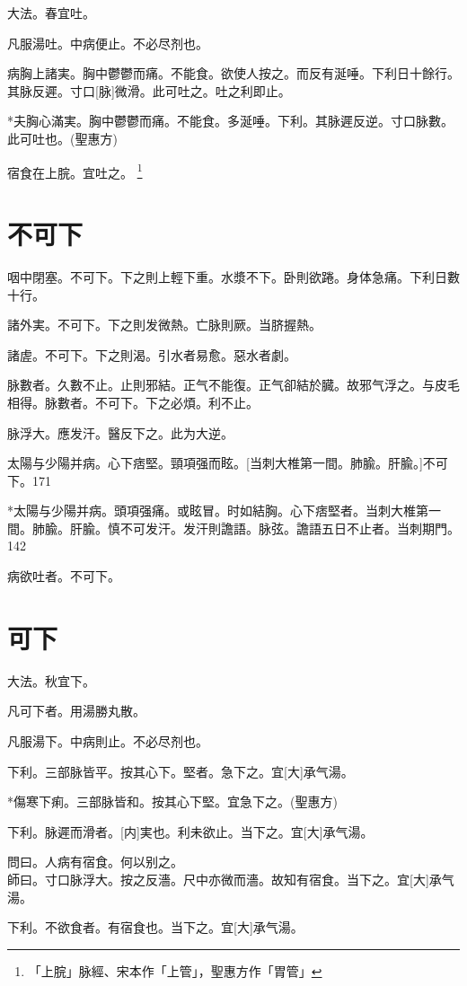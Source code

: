 \documentclass[12pt,twoside,UTF8,b5paper]{ctexbook}
\begin{document}
大法。春宜吐。

凡服湯吐。中病便止。不必尽剂也。

病胸上諸実。胸中鬱鬱而痛。不能食。欲使人按之。而反有涎唾。下利日十餘行。其脉反遲。寸口[脉]微滑。此可吐之。吐之利即止。

*夫胸心滿実。胸中鬱鬱而痛。不能食。多涎唾。下利。其脉遲反逆。寸口脉數。此可吐也。(聖惠方)

宿食在上脘。宜吐之。
	\footnote{「上脘」脉經、宋本作「上管」，聖惠方作「胃管」}

\chapter{不可下}

咽中閉塞。不可下。下之則上輕下重。水漿不下。卧則欲踡。身体急痛。下利日數十行。

諸外実。不可下。下之則发微熱。亡脉則厥。当脐握熱。

諸虗。不可下。下之則渴。引水者易愈。惡水者劇。

脉數者。久數不止。止則邪結。正气不能復。正气卻結於臓。故邪气浮之。与皮毛相得。脉數者。不可下。下之必煩。利不止。

脉浮大。應发汗。醫反下之。此为大逆。

太陽与少陽并病。心下痞堅。頸項强而眩。[当刺大椎第一間。肺腧。肝腧。]不可下。171

*太陽与少陽并病。頭項强痛。或眩冒。时如結胸。心下痞堅者。当刺大椎第一間。肺腧。肝腧。慎不可发汗。发汗則譫語。脉弦。譫語五日不止者。当刺期門。142

病欲吐者。不可下。

\chapter{可下}

大法。秋宜下。

凡可下者。用湯勝丸散。

凡服湯下。中病則止。不必尽剂也。

下利。三部脉皆平。按其心下。堅者。急下之。宜[大]承气湯。

*傷寒下痢。三部脉皆和。按其心下堅。宜急下之。(聖惠方)

下利。脉遲而滑者。[内]実也。利未欲止。当下之。宜[大]承气湯。

問曰。人病有宿食。何以别之。\\
師曰。寸口脉浮大。按之反濇。尺中亦微而濇。故知有宿食。当下之。宜[大]承气湯。

下利。不欲食者。有宿食也。当下之。宜[大]承气湯。
\end{document}
